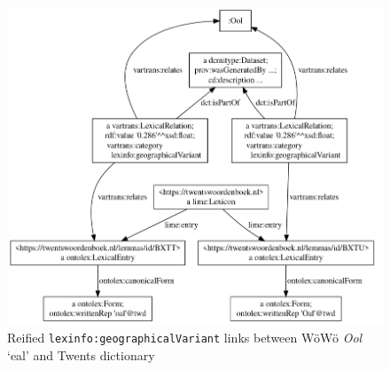 \documentclass[11pt]{article}
\newcommand{\word}[1]{\textsl{#1}} %
\newcommand{\onto}[1]{\texttt{#1}} %
\begin{document}
\begin{enumerate}
\begin{figure}
    \centering
    \includegraphics[width=0.9\linewidth]{img/links-vis.png}
    \caption{Reified \onto{lexinfo:geographicalVariant} links between WöWö \word{Ool} `eal' and Twents dictionary}
    \label{fig-links}
\end{figure}

% 
% 
% 
% 
% 
% 
% 
% 
% 


\end{enumerate}
\end{document}
